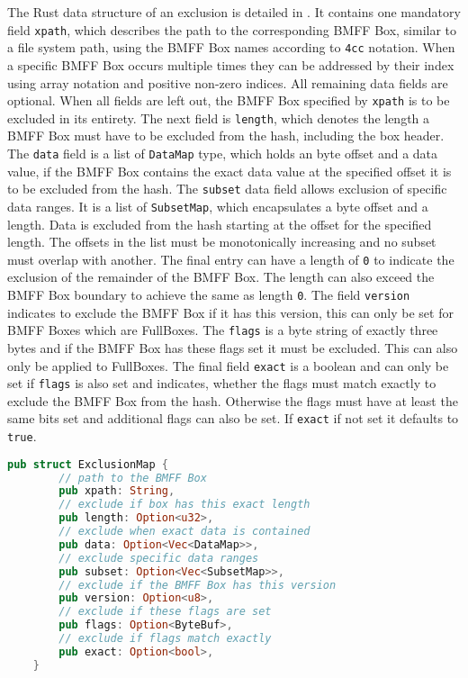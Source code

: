 The Rust data structure of an exclusion is detailed in . It contains one mandatory field \texttt{xpath}, which describes the path to the corresponding BMFF Box, similar to a file system path, using the BMFF Box names according to \texttt{4cc} notation. When a specific BMFF Box occurs multiple times they can be addressed by their index using array notation and positive non-zero indices. All remaining data fields are optional. When all fields are left out, the BMFF Box specified by \texttt{xpath} is to be excluded in its entirety. The next field is \texttt{length}, which denotes the length a BMFF Box must have to be excluded from the hash, including the box header. The \texttt{data} field is a list of \texttt{DataMap} type, which holds an byte offset and a data value, if the BMFF Box contains the exact data value at the specified offset it is to be excluded from the hash. The \texttt{subset} data field allows exclusion of specific data ranges. It is a list of \texttt{SubsetMap}, which encapsulates a byte offset and a length. Data is excluded from the hash starting at the offset for the specified length. The offsets in the list must be monotonically increasing and no subset must overlap with another. The final entry can have a length of \texttt{0} to indicate the exclusion of the remainder of the BMFF Box. The length can also exceed the BMFF Box boundary to achieve the same as length \texttt{0}. The field \texttt{version} indicates to exclude the BMFF Box if it has this version, this can only be set for BMFF Boxes which are FullBoxes. The \texttt{flags} is a byte string of exactly three bytes and if the BMFF Box has these flags set it must be excluded. This can also only be applied to FullBoxes. The final field \texttt{exact} is a boolean and can only be set if \texttt{flags} is also set and indicates, whether the flags must match exactly to exclude the BMFF Box from the hash. Otherwise the flags must have at least the same bits set and additional flags can also be set. If \texttt{exact} if not set it defaults to \texttt{true}.

\begin{minipage}{0.95\linewidth}
\begin{lstlisting}[caption={ExclusionMap Rust Definition}, label=code:exclusion_map, language=Rust, captionpos=b]
    pub struct ExclusionMap {
        // path to the BMFF Box
        pub xpath: String,
        // exclude if box has this exact length
        pub length: Option<u32>,
        // exclude when exact data is contained
        pub data: Option<Vec<DataMap>>,
        // exclude specific data ranges
        pub subset: Option<Vec<SubsetMap>>,
        // exclude if the BMFF Box has this version
        pub version: Option<u8>,
        // exclude if these flags are set
        pub flags: Option<ByteBuf>,
        // exclude if flags match exactly
        pub exact: Option<bool>,
    }
\end{lstlisting}
\end{minipage}

